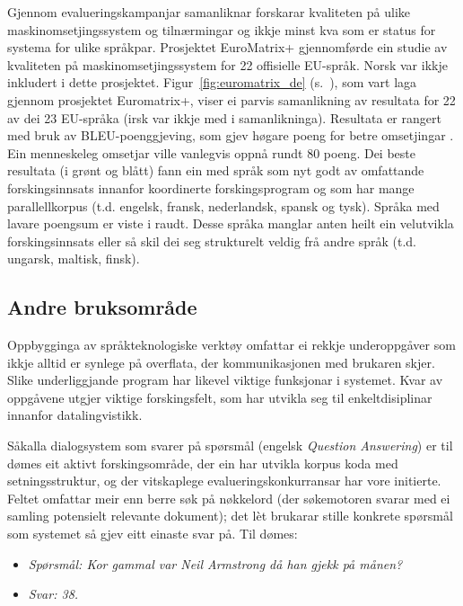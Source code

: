 \begin{multicols}{2}
Gjennom evalueringskampanjar samanliknar forskarar kvaliteten på ulike maskinomsetjingssystem og tilnærmingar og ikkje minst kva som er status for systema for ulike språkpar.
Prosjektet EuroMatrix+ gjennomførde ein studie av kvaliteten på maskinomsetjingssystem for 22 offisielle EU-språk. Norsk var ikkje inkludert i dette prosjektet.
Figur~\ref{fig:euromatrix_de} (s.~\pageref{fig:euromatrix_de}), som vart laga gjennom prosjektet Euromatrix+, viser ei parvis samanlikning av resultata for 22 av dei 23 EU-språka (irsk var ikkje med i samanlikninga). Resultata er rangert med bruk av BLEU-poenggjeving, som gjev høgare poeng for betre omsetjingar \cite{bleu1}. Ein menneskeleg omsetjar ville vanlegvis oppnå rundt 80 poeng. Dei beste resultata (i grønt og blått) fann ein med språk som nyt godt av omfattande forskingsinnsats innanfor koordinerte forskingsprogram og som har mange parallellkorpus (t.d. engelsk, fransk, nederlandsk, spansk og tysk). Språka med lavare poengsum er viste i raudt. Desse språka manglar anten heilt ein velutvikla forskingsinnsats eller så skil dei seg strukturelt veldig frå andre språk (t.d. ungarsk, maltisk, finsk).  

\subsection{Andre bruksområde}

Oppbygginga av språkteknologiske verktøy omfattar ei rekkje underoppgåver som ikkje alltid er synlege på overflata, der kommunikasjonen med brukaren skjer. Slike underliggjande program har likevel viktige funksjonar i systemet. Kvar av oppgåvene utgjer viktige forskingsfelt, som har utvikla seg til enkeltdisiplinar innanfor datalingvistikk.

Såkalla dialogsystem som svarer på spørsmål (engelsk \textit{Question Answering}) er til dømes eit aktivt forskingsområde, der ein har utvikla korpus koda med setningsstruktur, og der vitskaplege evalueringskonkurransar har vore initierte. Feltet omfattar meir enn berre søk på nøkkelord (der søkemotoren svarar med ei samling potensielt relevante dokument); det lèt brukarar stille konkrete spørsmål som systemet så gjev eitt einaste svar på. Til dømes:

\begin{itemize}
\item[] \textit{Spørsmål: Kor gammal var Neil Armstrong då han gjekk på månen?}
\item[] \textit{Svar: 38.}
\end{itemize}


\end{multicols}
